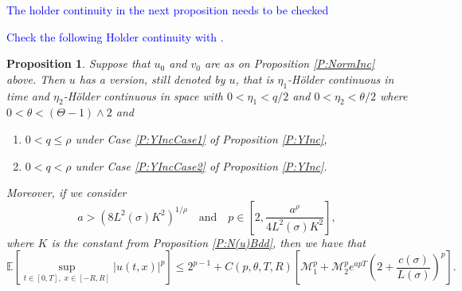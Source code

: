 \documentclass[a4paper,11pt]{article}
\numberwithin{equation}{section}
\theoremstyle{plain}
\newtheorem{proposition}[theorem]{Proposition}
\theoremstyle{definition}
\numberwithin{NQ}{section}
\numberwithin{LQ}{section}
\numberwithin{ZQ}{section}
\begin{document}
	\textcolor{blue}{The holder continuity in the next proposition needs to be checked}
	
	\textcolor{blue}{Check the following Holder continuity with \cite{ChenHu21}.}
	
	\begin{proposition}
		\label{P:Holder}
		Suppose that $u_0$ and $v_0$ are as on Proposition \ref{P:NormInc} above. Then $u$ has a version, still denoted by $u$, that is $\eta_1$-H\"older continuous in time and $\eta_2$-H\"older continuous in space with $0<\eta_1 < q/2$ and $0<\eta_2 < \theta/2$ where $0< \theta < (\Theta -1) \wedge 2$ and
		\begin{enumerate}
			\item $0< q \le \rho$ under Case \ref{P:YIncCase1} of Proposition \ref{P:YInc},
			\item $0 < q < \rho$ under Case \ref{P:YIncCase2} of Proposition \ref{P:YInc}.
		\end{enumerate}
		Moreover, if we consider
		\[
		a > \left( 8 L^2(\sigma)K^2\right)^{1/\rho} \quad \text{and} \quad 	p \in \left[ 2, \frac{a^{\rho}}{4L^2(\sigma)K^2} \right],
		\]
		where $K$ is the constant from Proposition \ref{P:N(u)Bdd}, then we have that 
		\[
		\mathbb{E}\left[ \sup_{t\in[0,T],\; x\in[-R,R]} |u(t,x)|^p \right] \le 2^{p-1} + C(p, \theta, T,R) \left[ \mathcal{M}_1^p + \mathcal{M}_2^p e^{apT} \left(2 +  \frac{c(\sigma)}{L(\sigma)}\right)^p\right].
		\]
	\end{proposition}
	
\end{document}
